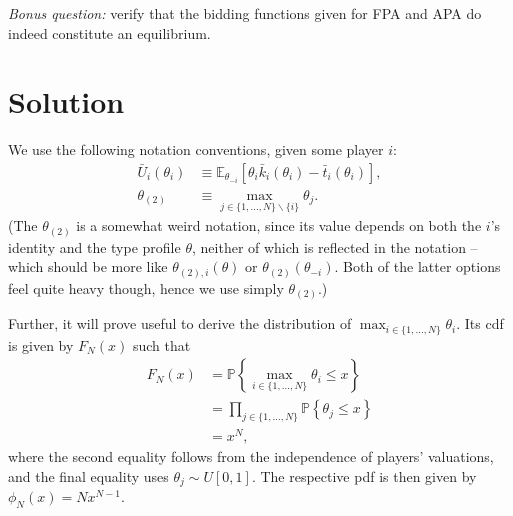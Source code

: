 \documentclass[a4paper]{article}
\newif\ifsolutions
\begin{document}
\emph{Bonus question:} verify that the bidding functions given for FPA and APA do indeed constitute an equilibrium.

\ifsolutions
\section*{Solution}

We use the following notation conventions, given some player $i$:
\begin{align*}
	\bar{U}_i(\theta_i) &\equiv \mathbb{E}_{\theta_{-i}} \left[ \theta_i \bar{k}_i(\theta_i) - \bar{t}_i(\theta_i) \right],
	\\
	\theta_{(2)} &\equiv \max_{j \in \{1,...,N\} \backslash \{i\}} \theta_j .
\end{align*}
(The $\theta_{(2)}$ is a somewhat weird notation, since its value depends on both the $i$'s identity and the type profile $\theta$, neither of which is reflected in the notation -- which should be more like $\theta_{(2),i}(\theta)$ or $\theta_{(2)}(\theta_{-i})$. Both of the latter options feel quite heavy though, hence we use simply $\theta_{(2)}$.)

Further, it will prove useful to derive the distribution of $\max_{i \in \{1,...,N\}} \theta_i$. Its cdf is given by $F_N(x)$ such that
\begin{equation} \label{eq:auc_Fmax}
\begin{aligned}
	F_{N}(x) 
	&= \mathbb{P} \left\{ \max_{i \in \{1,...,N\}} \theta_i \leq x \right\}
	\\
	&= \prod_{j \in \{1,...,N\}} \mathbb{P} \left\{ \theta_j \leq x \right\}
	\\
	&= x^N,
\end{aligned}
\end{equation}
where the second equality follows from the independence of players' valuations, and the final equality uses $\theta_j \sim U[0,1]$. The respective pdf is then given by $\phi_{N}(x) = Nx^{N-1}$.
\end{document}
